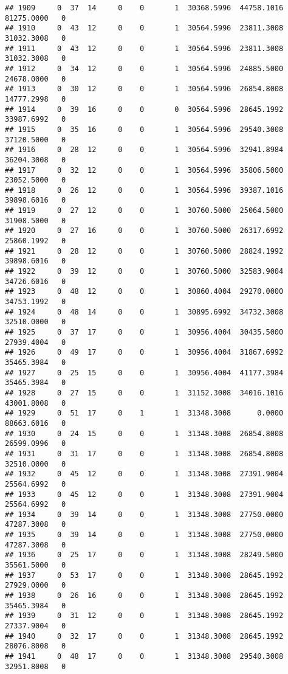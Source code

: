 \documentclass[
]{article}
\begin{document}
\begin{enumerate}
\begin{verbatim}
## 1909     0  37  14     0    0       1  30368.5996  44758.1016  81275.0000   0
## 1910     0  43  12     0    0       1  30564.5996  23811.3008  31032.3008   0
## 1911     0  43  12     0    0       1  30564.5996  23811.3008  31032.3008   0
## 1912     0  34  12     0    0       1  30564.5996  24885.5000  24678.0000   0
## 1913     0  30  12     0    0       1  30564.5996  26854.8008  14777.2998   0
## 1914     0  39  16     0    0       0  30564.5996  28645.1992  33987.6992   0
## 1915     0  35  16     0    0       1  30564.5996  29540.3008  37120.5000   0
## 1916     0  28  12     0    0       1  30564.5996  32941.8984  36204.3008   0
## 1917     0  32  12     0    0       1  30564.5996  35806.5000  23052.5000   0
## 1918     0  26  12     0    0       1  30564.5996  39387.1016  39898.6016   0
## 1919     0  27  12     0    0       1  30760.5000  25064.5000  31908.5000   0
## 1920     0  27  16     0    0       1  30760.5000  26317.6992  25860.1992   0
## 1921     0  28  12     0    0       1  30760.5000  28824.1992  39898.6016   0
## 1922     0  39  12     0    0       1  30760.5000  32583.9004  34726.6016   0
## 1923     0  48  12     0    0       1  30860.4004  29270.0000  34753.1992   0
## 1924     0  48  14     0    0       1  30895.6992  34732.3008  32510.0000   0
## 1925     0  37  17     0    0       1  30956.4004  30435.5000  27939.4004   0
## 1926     0  49  17     0    0       1  30956.4004  31867.6992  35465.3984   0
## 1927     0  25  15     0    0       1  30956.4004  41177.3984  35465.3984   0
## 1928     0  27  15     0    0       1  31152.3008  34016.1016  43001.8008   0
## 1929     0  51  17     0    1       1  31348.3008      0.0000  88663.6016   0
## 1930     0  24  15     0    0       1  31348.3008  26854.8008  26599.0996   0
## 1931     0  31  17     0    0       1  31348.3008  26854.8008  32510.0000   0
## 1932     0  45  12     0    0       1  31348.3008  27391.9004  25564.6992   0
## 1933     0  45  12     0    0       1  31348.3008  27391.9004  25564.6992   0
## 1934     0  39  14     0    0       1  31348.3008  27750.0000  47287.3008   0
## 1935     0  39  14     0    0       1  31348.3008  27750.0000  47287.3008   0
## 1936     0  25  17     0    0       1  31348.3008  28249.5000  35561.5000   0
## 1937     0  53  17     0    0       1  31348.3008  28645.1992  27929.0000   0
## 1938     0  26  16     0    0       1  31348.3008  28645.1992  35465.3984   0
## 1939     0  31  12     0    0       1  31348.3008  28645.1992  27337.9004   0
## 1940     0  32  17     0    0       1  31348.3008  28645.1992  28076.8008   0
## 1941     0  48  17     0    0       1  31348.3008  29540.3008  32951.8008   0

\end{verbatim}
\end{enumerate}
\end{document}
